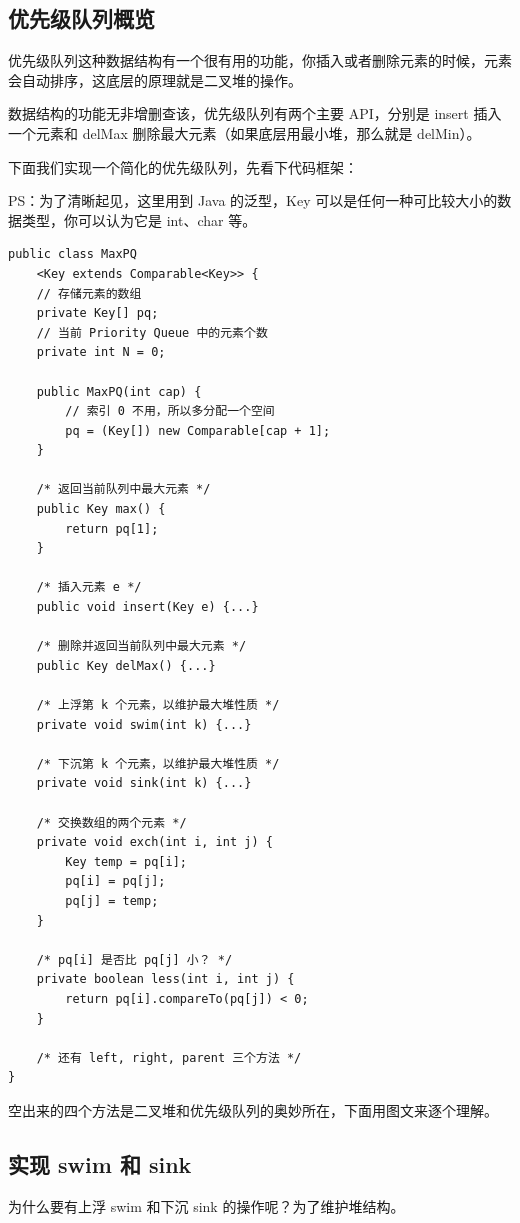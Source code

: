 \documentclass[12pt]{article}
\begin{document}
\subsection{优先级队列概览}
优先级队列这种数据结构有一个很有用的功能，你插入或者删除元素的时候，元素会自动排序，这底层的原理就是二叉堆的操作。

数据结构的功能无非增删查该，优先级队列有两个主要 API，分别是 insert 插入一个元素和 delMax 删除最大元素（如果底层用最小堆，那么就是 delMin）。

下面我们实现一个简化的优先级队列，先看下代码框架：

PS：为了清晰起见，这里用到 Java 的泛型，Key 可以是任何一种可比较大小的数据类型，你可以认为它是 int、char 等。
\begin{lstlisting}
public class MaxPQ
    <Key extends Comparable<Key>> {
    // 存储元素的数组
    private Key[] pq;
    // 当前 Priority Queue 中的元素个数
    private int N = 0;

    public MaxPQ(int cap) {
        // 索引 0 不用，所以多分配一个空间
        pq = (Key[]) new Comparable[cap + 1];
    }

    /* 返回当前队列中最大元素 */
    public Key max() {
        return pq[1];
    }

    /* 插入元素 e */
    public void insert(Key e) {...}

    /* 删除并返回当前队列中最大元素 */
    public Key delMax() {...}

    /* 上浮第 k 个元素，以维护最大堆性质 */
    private void swim(int k) {...}

    /* 下沉第 k 个元素，以维护最大堆性质 */
    private void sink(int k) {...}

    /* 交换数组的两个元素 */
    private void exch(int i, int j) {
        Key temp = pq[i];
        pq[i] = pq[j];
        pq[j] = temp;
    }

    /* pq[i] 是否比 pq[j] 小？ */
    private boolean less(int i, int j) {
        return pq[i].compareTo(pq[j]) < 0;
    }

    /* 还有 left, right, parent 三个方法 */
}
\end{lstlisting}

空出来的四个方法是二叉堆和优先级队列的奥妙所在，下面用图文来逐个理解。

\subsection{实现 swim 和 sink}
为什么要有上浮 swim 和下沉 sink 的操作呢？为了维护堆结构。
\end{document}
